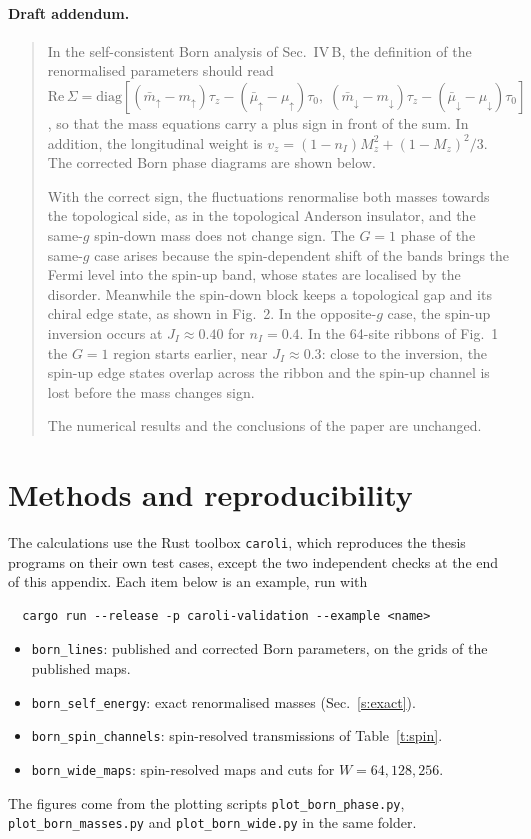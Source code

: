\documentclass[11pt,a4paper]{article}
\newcommand{\up}{{\uparrow}}
\newcommand{\dn}{{\downarrow}}
\begin{document}
\paragraph{Draft addendum.}
\begin{quote}\small
In the self-consistent Born analysis of Sec.~IV\,B, the definition of the renormalised
parameters should read
$\mathrm{Re}\,\Sigma = \mathrm{diag}[(\bar m_\up-m_\up)\tau_z-(\bar\mu_\up-\mu_\up)\tau_0,\;(\bar m_\dn-m_\dn)\tau_z-(\bar\mu_\dn-\mu_\dn)\tau_0]$,
so that the mass equations carry a plus sign in front of the sum. In addition, the
longitudinal weight is $v_z=(1-n_I)M_z^2+(1-M_z)^2/3$. The corrected Born phase diagrams are
shown below.

With the correct sign, the fluctuations renormalise both masses towards the topological side,
as in the topological Anderson insulator, and the same-$g$ spin-down mass does not change sign. The
$G=1$ phase of the same-$g$ case arises because the spin-dependent shift of the bands brings
the Fermi level into the spin-up band, whose states are localised by the disorder. Meanwhile
the spin-down block keeps a topological gap and its chiral edge state, as shown in Fig.~2. In
the opposite-$g$ case, the spin-up inversion occurs at $J_I\approx0.40$ for $n_I=0.4$. In the
64-site ribbons of Fig.~1 the $G=1$ region starts earlier, near $J_I\approx0.3$: close to the
inversion, the spin-up edge states overlap across the ribbon and the spin-up channel is lost
before the mass changes sign.

The numerical results and the conclusions of the paper are unchanged.
\end{quote}

\appendix
\section{Methods and reproducibility}\label{a:methods}

The calculations use the Rust toolbox \texttt{caroli}, which reproduces the thesis programs on
their own test cases, except the two independent checks at the end of this appendix. Each item
below is an example, run with
\begin{verbatim}
  cargo run --release -p caroli-validation --example <name>
\end{verbatim}
\begin{itemize}
\item \texttt{born\_lines}: published and corrected Born parameters, on the grids of the
  published maps.
\item \texttt{born\_self\_energy}: exact renormalised masses (Sec.~\ref{s:exact}).
\item \texttt{born\_spin\_channels}: spin-resolved transmissions of Table~\ref{t:spin}.
\item \texttt{born\_wide\_maps}: spin-resolved maps and cuts for $W=64,128,256$.
\end{itemize}
The figures come from the plotting scripts \texttt{plot\_born\_phase.py},
\texttt{plot\_born\_masses.py} and \texttt{plot\_born\_wide.py} in the same folder.
\end{document}
